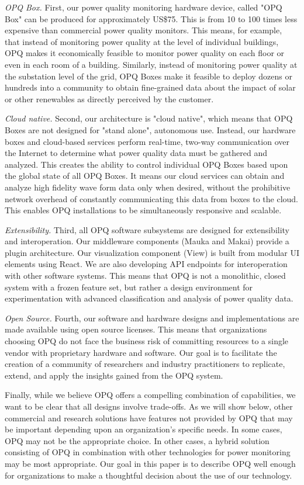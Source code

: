 {\em OPQ Box.} First, our power quality monitoring hardware device, called "OPQ Box" can be produced for approximately US\$75. This is from 10 to 100 times less expensive than commercial power quality monitors. This means, for example, that instead of monitoring power quality at the level of individual buildings, OPQ makes it economically feasible to monitor power quality on each floor or even in each room of a building. Similarly, instead of monitoring power quality at the substation level of the grid, OPQ Boxes make it feasible to deploy dozens or hundreds into a community to obtain fine-grained data about the impact of solar or other renewables as directly perceived by the customer.

{\em Cloud native.} Second, our architecture is "cloud native", which means that OPQ Boxes are not designed for "stand alone", autonomous use. Instead, our hardware boxes and cloud-based services perform real-time, two-way communication over the Internet to determine what power quality data must be gathered and analyzed. This creates the ability to control individual OPQ Boxes based upon the global state of all OPQ Boxes. It means our cloud services can obtain and analyze high fidelity wave form data only when desired, without the prohibitive network overhead of constantly communicating this data from boxes to the cloud. This enables OPQ installations to be simultaneously responsive and scalable.

{\em Extensibility.} Third, all OPQ software subsystems are designed for extensibility and interoperation. Our middleware components (Mauka and Makai) provide a plugin architecture. Our visualization component (View) is built from modular UI elements using React. We are also developing API endpoints for interoperation with other software systems. This means that OPQ is not a monolithic, closed system with a frozen feature set, but rather a design environment for experimentation with advanced classification and analysis of power quality data.

{\em Open Source.} Fourth, our software and hardware designs and implementations are made available using open source licenses. This means that organizations choosing OPQ do not face the business risk of committing resources to a single vendor with proprietary hardware and software. Our goal is to facilitate the creation of a community of researchers and industry practitioners to replicate, extend, and apply the insights gained from the OPQ system.

Finally, while we believe OPQ offers a compelling combination of capabilities, we want to be clear that all designs involve trade-offs. As we will show below, other commercial and research solutions have features not provided by OPQ that may be important depending upon an organization's specific needs. In some cases, OPQ may not be the appropriate choice. In other cases, a hybrid solution consisting of OPQ in combination with other technologies for power monitoring may be most appropriate. Our goal in this paper is to describe OPQ well enough for organizations to make a thoughtful decision about the use of our technology.


